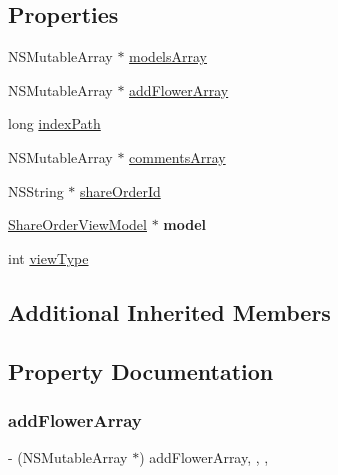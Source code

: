 \subsection*{Properties}
\begin{DoxyCompactItemize}
\item 
N\+S\+Mutable\+Array $\ast$ \mbox{\hyperlink{interface_share_details_view_controller_adaa5f842bd406abc17153085725aa732}{models\+Array}}
\item 
N\+S\+Mutable\+Array $\ast$ \mbox{\hyperlink{interface_share_details_view_controller_a175be724c911e775dc1596569c86d405}{add\+Flower\+Array}}
\item 
long \mbox{\hyperlink{interface_share_details_view_controller_a7e70939fd67272a0fab6d792b043d105}{index\+Path}}
\item 
N\+S\+Mutable\+Array $\ast$ \mbox{\hyperlink{interface_share_details_view_controller_a81d9e20185cec04e6b3fb21bf8529585}{comments\+Array}}
\item 
N\+S\+String $\ast$ \mbox{\hyperlink{interface_share_details_view_controller_a9a79f8355ea8a22b1f32416d82cfd2bb}{share\+Order\+Id}}
\item 
\mbox{\label{interface_share_details_view_controller_a3b254249010755a08735da7ab5463a53}} 
\mbox{\hyperlink{interface_share_order_view_model}{Share\+Order\+View\+Model}} $\ast$ {\bfseries model}
\item 
int \mbox{\hyperlink{interface_share_details_view_controller_a47747a996edaf96f4cfa799ad407c5d4}{view\+Type}}
\end{DoxyCompactItemize}
\subsection*{Additional Inherited Members}


\subsection{Property Documentation}
\mbox{\label{interface_share_details_view_controller_a175be724c911e775dc1596569c86d405}} 
\subsubsection{\texorpdfstring{add\+Flower\+Array}{addFlowerArray}}
{\footnotesize\ttfamily -\/ (N\+S\+Mutable\+Array $\ast$) add\+Flower\+Array\hspace{0.3cm}{\ttfamily [read]}, {\ttfamily [write]}, {\ttfamily [nonatomic]}, {\ttfamily [strong]}}

